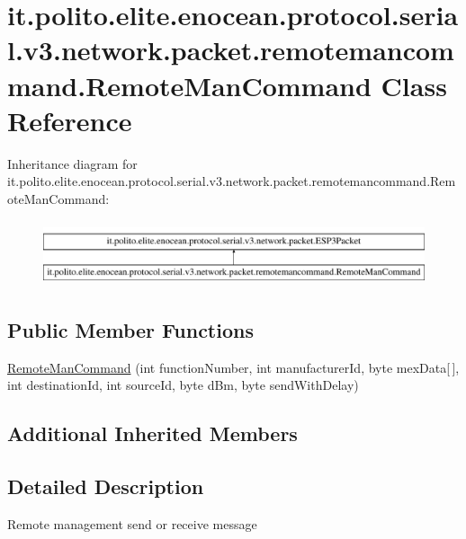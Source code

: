\hypertarget{classit_1_1polito_1_1elite_1_1enocean_1_1protocol_1_1serial_1_1v3_1_1network_1_1packet_1_1remoteb098a23adcfeb391a74cc6bc10c55d47}{}\section{it.\+polito.\+elite.\+enocean.\+protocol.\+serial.\+v3.\+network.\+packet.\+remotemancommand.\+Remote\+Man\+Command Class Reference}
\label{classit_1_1polito_1_1elite_1_1enocean_1_1protocol_1_1serial_1_1v3_1_1network_1_1packet_1_1remoteb098a23adcfeb391a74cc6bc10c55d47}
Inheritance diagram for it.\+polito.\+elite.\+enocean.\+protocol.\+serial.\+v3.\+network.\+packet.\+remotemancommand.\+Remote\+Man\+Command\+:\begin{figure}[H]
\begin{center}
\leavevmode
\includegraphics[height=1.947826cm]{classit_1_1polito_1_1elite_1_1enocean_1_1protocol_1_1serial_1_1v3_1_1network_1_1packet_1_1remoteb098a23adcfeb391a74cc6bc10c55d47}
\end{center}
\end{figure}
\subsection*{Public Member Functions}
\begin{DoxyCompactItemize}
\item 
\hyperlink{classit_1_1polito_1_1elite_1_1enocean_1_1protocol_1_1serial_1_1v3_1_1network_1_1packet_1_1remoteb098a23adcfeb391a74cc6bc10c55d47_a46d391537cafd566c87dc1a21cbe616c}{Remote\+Man\+Command} (int function\+Number, int manufacturer\+Id, byte mex\+Data\mbox{[}$\,$\mbox{]}, int destination\+Id, int source\+Id, byte d\+Bm, byte send\+With\+Delay)
\end{DoxyCompactItemize}
\subsection*{Additional Inherited Members}


\subsection{Detailed Description}
Remote management send or receive message

